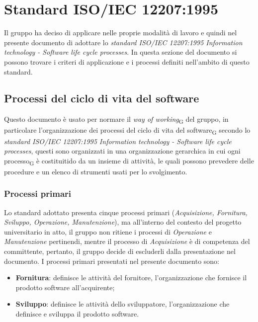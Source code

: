\section{Standard ISO/IEC 12207:1995}
Il gruppo ha deciso di applicare nelle proprie modalità di lavoro e quindi nel presente documento di adottare lo \textit{standard ISO/IEC 12207:1995 Information technology - Software life cycle processes}. In questa sezione del documento si possono trovare i criteri di applicazione e i processi definiti nell'ambito di questo standard.
\subsection{Processi del ciclo di vita del software}
Questo documento è usato per normare il \textit{way of working}\textsubscript{G} del gruppo, in particolare l'organizzazione dei processi del ciclo di vita del software\textsubscript{G} secondo lo \textit{standard ISO/IEC 12207:1995 Information technology - Software life cycle processes}, questi sono organizzati in una organizzazione gerarchica in cui ogni processo\textsubscript{G} è costituitido da un insieme di attività, le quali possono prevedere delle procedure e un elenco di strumenti usati per lo svolgimento.
\subsubsection{Processi primari}
Lo standard adottato presenta cinque processi primari (\textit{Acquisizione, Fornitura, Sviluppo, Operazione, Manutenzione}), ma all’interno del contesto del progetto universitario in atto, il gruppo non ritiene i processi di \textit{Operazione} e \textit{Manutenzione} pertinendi, mentre il processo di \textit{Acquisizione} è di competenza del committente, pertanto, il gruppo decide di escluderli dalla presentazione nel documento.
I processi primari presentati nel presente documento sono:
\begin{itemize}
    \item \textbf{Fornitura}: definisce le attività del fornitore, l’organizzazione che fornisce il prodotto software all’acquirente;
    \item \textbf{Sviluppo}: definisce le attività dello sviluppatore, l’organizzazione che definisce e sviluppa il prodotto software.
\end{itemize}

